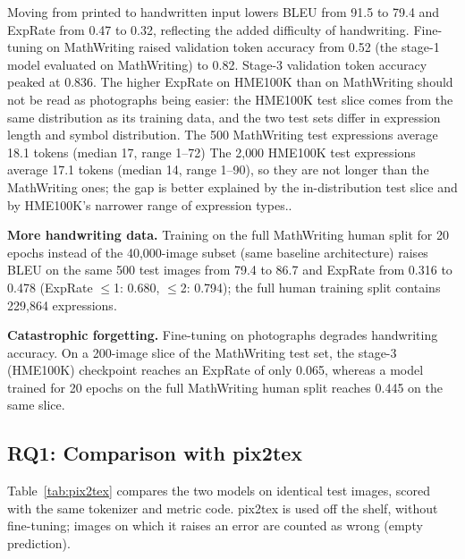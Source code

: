 \documentclass[conference]{IEEEtran}
\begin{document}
Moving from printed to handwritten input lowers BLEU from 91.5 to 79.4 and ExpRate from 0.47 to 0.32, reflecting the added difficulty of handwriting. Fine-tuning on MathWriting raised validation token accuracy from 0.52 (the stage-1 model evaluated on MathWriting) to 0.82. Stage-3 validation token accuracy peaked at 0.836. The higher ExpRate on HME100K than on MathWriting should not be read as photographs being easier: the HME100K test slice comes from the same distribution as its training data, and the two test sets differ in expression length and symbol distribution. The 500 MathWriting test expressions average 18.1 tokens (median 17, range 1--72) The 2{,}000 HME100K test expressions average 17.1 tokens (median 14, range 1--90), so they are not longer than the MathWriting ones; the gap is better explained by the in-distribution test slice and by HME100K's narrower range of expression types..

\textbf{More handwriting data.} Training on the full MathWriting human split for 20 epochs instead of the 40{,}000-image subset (same baseline architecture) raises BLEU on the same 500 test images from 79.4 to 86.7 and ExpRate from 0.316 to 0.478 (ExpRate $\le$1: 0.680, $\le$2: 0.794); the full human training split contains 229{,}864 expressions.

\textbf{Catastrophic forgetting.} Fine-tuning on photographs degrades handwriting accuracy. On a 200-image slice of the MathWriting test set, the stage-3 (HME100K) checkpoint reaches an ExpRate of only 0.065, whereas a model trained for 20 epochs on the full MathWriting human split reaches 0.445 on the same slice.

\subsection{RQ1: Comparison with pix2tex}
Table~\ref{tab:pix2tex} compares the two models on identical test images, scored with the same tokenizer and metric code. pix2tex is used off the shelf, without fine-tuning; images on which it raises an error are counted as wrong (empty prediction).
\end{document}
